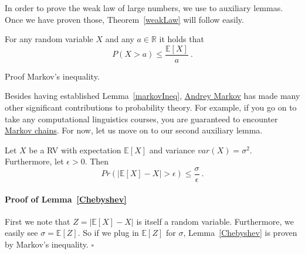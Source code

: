 In order to prove the weak law of large numbers, we use to auxiliary lemmas. Once we have proven those, Theorem~\ref{weakLaw} will follow easily. 

\begin{Lemma}\label{markovIneq}
For any random variable $ X $ and any $ a \in \mathbb{R} $ it holds that
$$ P(X > a) \leq \dfrac{\mathbb{E}[X]}{a} \ . $$
\end{Lemma}

\begin{Exercise}
Proof Markov's inequality.
\end{Exercise}

Besides having established Lemma~\ref{markovIneq}, \href{https://en.wikipedia.org/wiki/Andrey_Markov}{Andrey Markov} has made many other significant contributions to
probability theory. For example, if you go on to take any computational linguistics courses, you are guaranteed to encounter 
\href{https://en.wikipedia.org/wiki/Markov_chain}{Markov chains}. For now, let us move on to our second auxiliary lemma.

\begin{Lemma}\label{Chebyshev}
Let $ X $ be a RV with expectation $ \mathbb{E}[X] $ and variance $ var(X) = \sigma^{2} $. Furthermore, let $ \epsilon > 0 $. Then
$$ Pr(|\mathbb{E}[X] - X| > \epsilon) \leq \dfrac{\sigma}{\epsilon} \ . $$ 
\end{Lemma}

\paragraph{Proof of Lemma~\ref{Chebyshev}} 
First we note that $ Z = |\mathbb{E}[X] - X | $ is itself a random variable. Furthermore, we easily see $ \sigma = \mathbb{E}[Z] $.
So if we plug in $ \mathbb{E}[Z] $ for $ \sigma $, Lemma~\ref{Chebyshev} is proven by Markov's inequality. $ \square $

